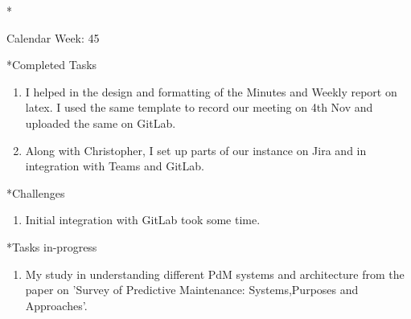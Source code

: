 \documentclass[11pt,a4paper]{article}
\begin{document}
\newpage
\begin{section}*{Calendar Week: 45 \hfill \date{06 November, 2020}}
 \begin{refsection}
     \begin{subsection}*{Completed Tasks}
         \begin{enumerate}
             \item
                   I helped in the design and formatting of the Minutes and Weekly report on latex. I used the same template to record our meeting on 4th Nov and uploaded the same on GitLab.
             \item
                   Along with Christopher, I set up parts of our instance on Jira and in integration with Teams and GitLab.
         \end{enumerate}
     \end{subsection}

     \begin{subsection}*{Challenges}
         \begin{enumerate}
             \item
                   Initial integration with GitLab took some time.
         \end{enumerate}
     \end{subsection}

     \begin{subsection}*{Tasks in-progress}
         \begin{enumerate}
             \item
                   My study in understanding different PdM systems and architecture from the paper on ’Survey of Predictive Maintenance: Systems,Purposes and Approaches’\cite{DBLP:journals/corr/abs-1912-07383}.
         \end{enumerate}
     \end{subsection}
     \printbibliography
 \end{refsection}
\end{section}
\end{document}
